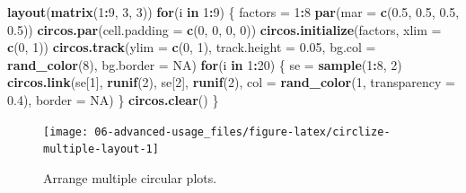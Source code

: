 \documentclass[]{book}
\newenvironment{Shaded}{\begin{snugshade}}{\end{snugshade}}
\newcommand{\KeywordTok}[1]{\textcolor[rgb]{0.13,0.29,0.53}{\textbf{#1}}}
\newcommand{\DataTypeTok}[1]{\textcolor[rgb]{0.13,0.29,0.53}{#1}}
\newcommand{\DecValTok}[1]{\textcolor[rgb]{0.00,0.00,0.81}{#1}}
\newcommand{\FloatTok}[1]{\textcolor[rgb]{0.00,0.00,0.81}{#1}}
\newcommand{\StringTok}[1]{\textcolor[rgb]{0.31,0.60,0.02}{#1}}
\newcommand{\OtherTok}[1]{\textcolor[rgb]{0.56,0.35,0.01}{#1}}
\newcommand{\ControlFlowTok}[1]{\textcolor[rgb]{0.13,0.29,0.53}{\textbf{#1}}}
\newcommand{\OperatorTok}[1]{\textcolor[rgb]{0.81,0.36,0.00}{\textbf{#1}}}
\newcommand{\NormalTok}[1]{#1}
\theoremstyle{definition}
\theoremstyle{definition}
\theoremstyle{remark}
\begin{document}
\begin{Shaded}
\begin{Highlighting}[]
\KeywordTok{layout}\NormalTok{(}\KeywordTok{matrix}\NormalTok{(}\DecValTok{1}\OperatorTok{:}\DecValTok{9}\NormalTok{, }\DecValTok{3}\NormalTok{, }\DecValTok{3}\NormalTok{))}
\ControlFlowTok{for}\NormalTok{(i }\ControlFlowTok{in} \DecValTok{1}\OperatorTok{:}\DecValTok{9}\NormalTok{) \{}
\NormalTok{    factors =}\StringTok{ }\DecValTok{1}\OperatorTok{:}\DecValTok{8}
    \KeywordTok{par}\NormalTok{(}\DataTypeTok{mar =} \KeywordTok{c}\NormalTok{(}\FloatTok{0.5}\NormalTok{, }\FloatTok{0.5}\NormalTok{, }\FloatTok{0.5}\NormalTok{, }\FloatTok{0.5}\NormalTok{))}
    \KeywordTok{circos.par}\NormalTok{(}\DataTypeTok{cell.padding =} \KeywordTok{c}\NormalTok{(}\DecValTok{0}\NormalTok{, }\DecValTok{0}\NormalTok{, }\DecValTok{0}\NormalTok{, }\DecValTok{0}\NormalTok{))}
    \KeywordTok{circos.initialize}\NormalTok{(factors, }\DataTypeTok{xlim =} \KeywordTok{c}\NormalTok{(}\DecValTok{0}\NormalTok{, }\DecValTok{1}\NormalTok{))}
    \KeywordTok{circos.track}\NormalTok{(}\DataTypeTok{ylim =} \KeywordTok{c}\NormalTok{(}\DecValTok{0}\NormalTok{, }\DecValTok{1}\NormalTok{), }\DataTypeTok{track.height =} \FloatTok{0.05}\NormalTok{,}
        \DataTypeTok{bg.col =} \KeywordTok{rand_color}\NormalTok{(}\DecValTok{8}\NormalTok{), }\DataTypeTok{bg.border =} \OtherTok{NA}\NormalTok{)}
    \ControlFlowTok{for}\NormalTok{(i }\ControlFlowTok{in} \DecValTok{1}\OperatorTok{:}\DecValTok{20}\NormalTok{) \{}
\NormalTok{        se =}\StringTok{ }\KeywordTok{sample}\NormalTok{(}\DecValTok{1}\OperatorTok{:}\DecValTok{8}\NormalTok{, }\DecValTok{2}\NormalTok{)}
        \KeywordTok{circos.link}\NormalTok{(se[}\DecValTok{1}\NormalTok{], }\KeywordTok{runif}\NormalTok{(}\DecValTok{2}\NormalTok{), se[}\DecValTok{2}\NormalTok{], }\KeywordTok{runif}\NormalTok{(}\DecValTok{2}\NormalTok{), }
            \DataTypeTok{col =} \KeywordTok{rand_color}\NormalTok{(}\DecValTok{1}\NormalTok{, }\DataTypeTok{transparency =} \FloatTok{0.4}\NormalTok{), }\DataTypeTok{border =} \OtherTok{NA}\NormalTok{)}
\NormalTok{    \}}
    \KeywordTok{circos.clear}\NormalTok{()}
\NormalTok{\}}
\end{Highlighting}
\end{Shaded}

\begin{figure}

{\centering \texttt{[image: 06-advanced-usage\_files/figure-latex/circlize-multiple-layout-1]} 

}

\caption{Arrange multiple circular plots.}\label{fig:circlize-multiple-layout}
\end{figure}
\end{document}
